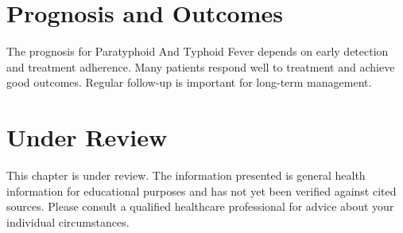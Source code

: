 \section*{Prognosis and Outcomes}
The prognosis for Paratyphoid And Typhoid Fever depends on early detection and treatment adherence. Many patients respond well to treatment and achieve good outcomes. Regular follow-up is important for long-term management.
\section*{Under Review}
This chapter is under review. The information presented is general health information for educational purposes and has not yet been verified against cited sources. Please consult a qualified healthcare professional for advice about your individual circumstances.


\clearpage
